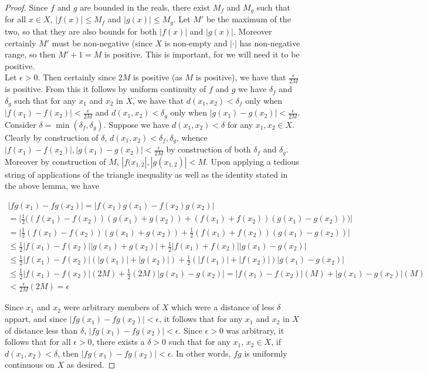 \documentclass[11pt]{article}
\theoremstyle{definition}
\begin{document}
\begin{proof}
Since $f$ and $g$ are bounded in the reals, there exist $M_f$ and $M_g$ such that for all $x\in X$, $|f(x)| \le M_f$ and $|g(x)| \le M_g$. Let $M'$ be the maximum of the two, so that they are also bounds for both $|f(x)|$ and $|g(x)|$. Moreover certainly $M'$ must be non-negative (since $X$ is non-empty and $|\cdot|$ has non-negative range, so then $M' + 1 = M$ is positive. This is important, for we will need it to be positive.\\

Let $\epsilon > 0$. Then certainly since $2M$ is positive (as $M$ is positive), we have that $\frac{\epsilon}{2M}$ is positive. From this it follows by uniform continuity of $f$ and $g$ we have $\delta_f$ and $\delta_g$ such that for any $x_1$ and $x_2$ in $X$, we have that $d(x_1, x_2)  < \delta_f$ only when $ |f(x_1) - f(x_2)| < \frac{\epsilon}{2M} $ and $ d(x_1, x_2) < \delta_g $ only when $ |g(x_1) - g(x_2)| < \frac{\epsilon}{2M} $. Consider $\delta = \min(\delta_f, \delta_g)$. Suppose we have $ d(x_1, x_2) < \delta $ for any $x_1 ,x_2\in X$. Clearly by construction of $\delta$, $d(x_1, x_2) < \delta_f,\delta_g$, whence $ |f(x_1) - f(x_2)|, |g(x_1) - g(x_2)| < \frac{\epsilon}{2M} $ by construction of both $\delta_f$ and $\delta_g$. Moreover by construction of $M$, $|f(x_{1,2}|, |g(x_{1,2})| < M$. Upon applying a tedious string of applications of the triangle inequality as well as the identity stated in the above lemma, we have

\[
\begin{array}{c}
|fg(x_1) - fg(x_2)| = |f(x_1) g(x_1) - f(x_2)g(x_2) |\\
= \Big| \frac{1}{2}\big( (f(x_1) - f(x_2))(g(x_1) + g(x_2)) + (f(x_1) + f(x_2))(g(x_1) - g(x_2)) \big) \Big|\\
=  \Big| \frac{1}{2}(f(x_1) - f(x_2))(g(x_1) + g(x_2)) + \frac{1}{2}(f(x_1) + f(x_2))(g(x_1) - g(x_2))  \Big|\\
\le \frac{1}{2}|f(x_1) - f(x_2)||g(x_1) + g(x_2)| + \frac{1}{2}|f(x_1) + f(x_2)||g(x_1) - g(x_2)|\\
\le \frac{1}{2}|f(x_1) - f(x_2)|(|g(x_1)| + |g(x_2)|) + \frac{1}{2}(|f(x_1)| + |f(x_2)|)|g(x_1) - g(x_2)|\\
\le \frac{1}{2}|f(x_1) - f(x_2)|(2M) + \frac{1}{2}(2M)|g(x_1) - g(x_2)| = |f(x_1) - f(x_2)|(M) + |g(x_1) - g(x_2)|(M) \\
< \frac{\epsilon}{2M}(2M) = \epsilon
\end{array}
\]

Since $x_1 $ and $x_2$ were arbitrary members of $X$ which were a distance of less $\delta$ appart, and since $ |fg(x_1) - fg(x_2)| < \epsilon $, it follows that for any $x_1$ and $x_2$ in $X$ of distance less than $\delta$, $|fg(x_1) - fg(x_2)| < \epsilon$. Since $\epsilon > 0$ was arbitrary, it follows that for all $\epsilon > 0$, there exists a $\delta> 0$ such that for any $x_1$, $x_2\in X$, if $d(x_1, x_2) < \delta$, then $ |fg(x_1) - fg(x_2)| < \epsilon  $. In other words, $fg$ is uniformly continuous on $X$ as desired.
\end{proof}
\end{document}
